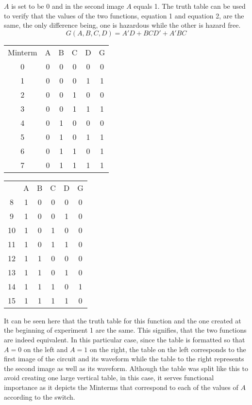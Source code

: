 \documentclass[12pt]{article}
\begin{document}
    $A$ is set to be 0 and in the second image $A$ equals 1. The truth table can
    be used to verify that the values of the two functions, equation 1 and
    equation 2, are the same, the only difference being, one is hazardous while
    the other is hazard free.
    \[
        G\left(A,B,C,D \right) = A'D + BCD' + A'BC
    \]
    \begin{center}
        \begin{tabular}{ccccc|c}
            Minterm & A & B & C & D & G \\
            \cmidrule{2-6}
            0 & 0 & 0 & 0 & 0 & 0 \\
            1 & 0 & 0 & 0 & 1 & 1 \\
            2 & 0 & 0 & 1 & 0 & 0 \\
            3 & 0 & 0 & 1 & 1 & 1 \\
            4 & 0 & 1 & 0 & 0 & 0 \\
            5 & 0 & 1 & 0 & 1 & 1 \\
            6 & 0 & 1 & 1 & 0 & 1 \\
            7 & 0 & 1 & 1 & 1 & 1 \\
        \end{tabular}
        \quad
        \begin{tabular}{ccccc|c}
            & A & B & C & D & G \\
            \cmidrule{2-6}
            8 & 1 & 0 & 0 & 0 & 0 \\
            9 & 1 & 0 & 0 & 1 & 0 \\
            10 & 1 & 0 & 1 & 0 & 0 \\
            11 & 1 & 0 & 1 & 1 & 0 \\
            12 & 1 & 1 & 0 & 0 & 0 \\
            13 & 1 & 1 & 0 & 1 & 0 \\
            14 & 1 & 1 & 1 & 0 & 1 \\
            15 & 1 & 1 & 1 & 1 & 0 \\
        \end{tabular}
    \end{center}
    \par It can be seen here that the truth table for this function and the one
    created at the beginning of experiment 1 are the same. This signifies, that
    the two functions are indeed equivalent. In this particular case, since the
    table is formatted so that $A=0$ on the left and $A=1$ on the right, the
    table on the left corresponds to the first image of the circuit and its
    waveform while the table to the right represents the second image as well as
    its waveform. Although the table was split like this to avoid creating one
    large vertical table, in this case, it serves functional importance as it
    depicts the Minterms that correspond to each of the values of $A$ according
    to the switch.
\end{document}
